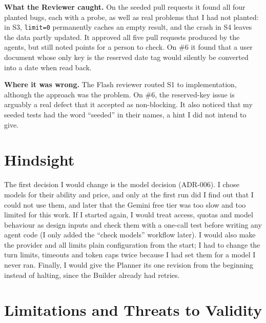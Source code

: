 \documentclass[10pt,a4paper]{article}
\newcommand{\code}[1]{\texttt{#1}}
\begin{document}
\textbf{What the Reviewer caught.} On the seeded pull requests it found all four planted bugs, each with
a probe, as well as real problems that I had not planted: in S3, \code{limit=0} permanently caches an empty
result, and the crash in S4 leaves the data partly updated. It approved all five pull requests produced
by the agents, but still noted points for a person to check. On \#6 it found that a user document whose
only key is the reserved date tag would silently be converted into a date when read back.

\textbf{Where it was wrong.} The Flash reviewer routed S1 to implementation, although the approach was
the problem. On \#6, the reserved-key issue is arguably a real defect that it accepted as non-blocking.
It also noticed that my seeded tests had the word ``seeded'' in their names, a hint I did not intend
to give.

\section{Hindsight}

The first decision I would change is the model decision (ADR-006). I chose models for their ability
and price, and only at the first run did I find out that I could not use them, and later that the Gemini
free tier was too slow and too limited for this work. If I started again, I would treat access, quotas
and model behaviour as design inputs and check them with a one-call test before writing any agent code
(I only added the ``check models'' workflow later). I would also make the provider and all limits plain
configuration from the start; I had to change the turn limits, timeouts and token caps twice because I
had set them for a model I never ran. Finally, I would give the Planner its one revision from the
beginning instead of halting, since the Builder already had retries.

\section{Limitations and Threats to Validity}
\end{document}
